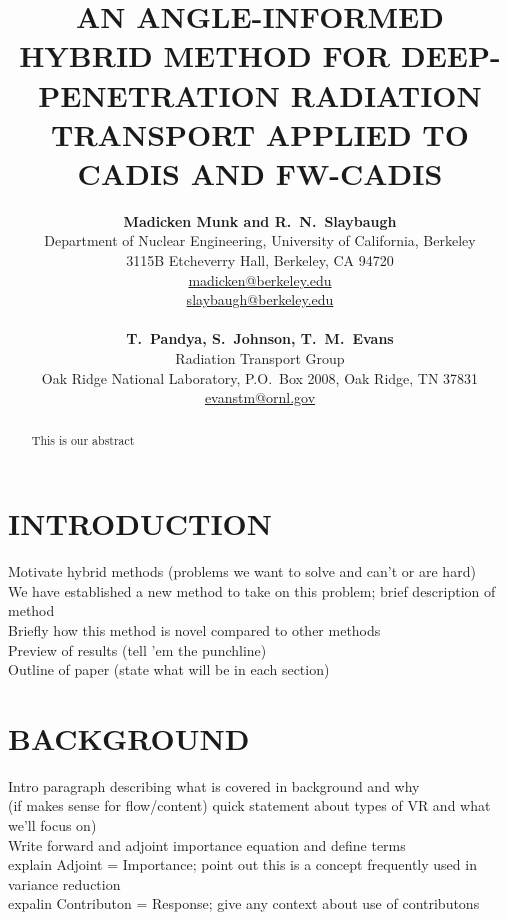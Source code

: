 \documentclass[12pt]{article}
\title{AN ANGLE-INFORMED HYBRID METHOD FOR DEEP-PENETRATION RADIATION TRANSPORT APPLIED TO CADIS AND FW-CADIS}
\author{ 
  \textbf{Madicken Munk and R.\ N.\ Slaybaugh} \\
  Department of Nuclear Engineering, University of California, Berkeley \\
  3115B Etcheverry Hall, Berkeley, CA 94720\\
  \href{mailto:madicken@berkeley.edu}{madicken@berkeley.edu}\\
  \href{mailto:slaybaugh@berkeley.edu}{slaybaugh@berkeley.edu}\\
  \\
  \textbf{T.\ Pandya, S.\ Johnson, T.\ M.\ Evans}\\
  Radiation Transport Group\\
  Oak Ridge National Laboratory, P.O.\ Box 2008, Oak Ridge, TN 37831\\
  \href{mailto:evanstm@ornl.gov}{evanstm@ornl.gov}
  }
\begin{document}


\maketitle

\begin{abstract}
This is our abstract
\end{abstract}


%
\section{INTRODUCTION}
\label{sect::intro}

Motivate hybrid methods (problems we want to solve and can't or are hard)\\
We have established a new method to take on this problem; brief description of method \\
Briefly how this method is novel compared to other methods\\
Preview of results (tell 'em the punchline)\\
Outline of paper (state what will be in each section)


%
\section{BACKGROUND}
\label{sect::second}

Intro paragraph describing what is covered in background and why\\
(if makes sense for flow/content) quick statement about types of VR and what we'll focus on)\\
Write forward and adjoint importance equation and define terms\\
explain Adjoint = Importance; point out this is a concept frequently used in variance reduction \\
expalin Contributon = Response; give any context about use of contributons \\
\end{document}
